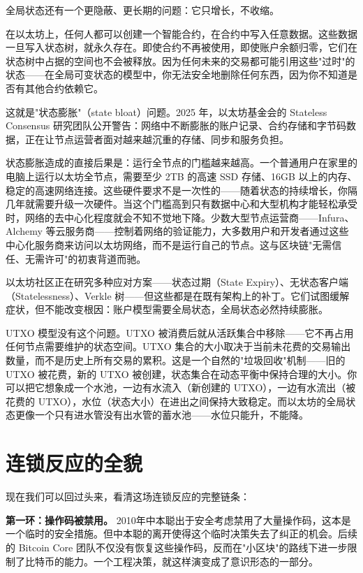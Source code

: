 \documentclass[a4paper,12pt,openany]{ctexbook}
\begin{document}
全局状态还有一个更隐蔽、更长期的问题：它只增长，不收缩。

在以太坊上，任何人都可以创建一个智能合约，在合约中写入任意数据。这些数据一旦写入状态树，就永久存在。即使合约不再被使用，即使账户余额归零，它们在状态树中占据的空间也不会被释放。因为任何未来的交易都可能引用这些"过时"的状态——在全局可变状态的模型中，你无法安全地删除任何东西，因为你不知道是否有其他合约依赖它。

这就是"状态膨胀"（state bloat）问题。2025 年，以太坊基金会的 Stateless Consensus 研究团队公开警告：网络中不断膨胀的账户记录、合约存储和字节码数据，正在让节点运营者面对越来越沉重的存储、同步和服务负担。

状态膨胀造成的直接后果是：运行全节点的门槛越来越高。一个普通用户在家里的电脑上运行以太坊全节点，需要至少 2TB 的高速 SSD 存储、16GB 以上的内存、稳定的高速网络连接。这些硬件要求不是一次性的——随着状态的持续增长，你隔几年就需要升级一次硬件。当这个门槛高到只有数据中心和大型机构才能轻松承受时，网络的去中心化程度就会不知不觉地下降。少数大型节点运营商——Infura、Alchemy 等云服务商——控制着网络的验证能力，大多数用户和开发者通过这些中心化服务商来访问以太坊网络，而不是运行自己的节点。这与区块链"无需信任、无需许可"的初衷背道而驰。

以太坊社区正在研究多种应对方案——状态过期（State Expiry）、无状态客户端（Statelessness）、Verkle 树——但这些都是在既有架构上的补丁。它们试图缓解症状，但不能改变根因：账户模型需要全局状态，全局状态必然持续膨胀。

UTXO 模型没有这个问题。UTXO 被消费后就从活跃集合中移除——它不再占用任何节点需要维护的状态空间。UTXO 集合的大小取决于当前未花费的交易输出数量，而不是历史上所有交易的累积。这是一个自然的"垃圾回收"机制——旧的 UTXO 被花费，新的 UTXO 被创建，状态集合在动态平衡中保持合理的大小。你可以把它想象成一个水池，一边有水流入（新创建的 UTXO），一边有水流出（被花费的 UTXO），水位（状态大小）在进出之间保持大致稳定。而以太坊的全局状态更像一个只有进水管没有出水管的蓄水池——水位只能升，不能降。


\section*{连锁反应的全貌}


现在我们可以回过头来，看清这场连锁反应的完整链条：

\textbf{第一环：操作码被禁用。} 2010年中本聪出于安全考虑禁用了大量操作码，这本是一个临时的安全措施。但中本聪的离开使得这个临时决策失去了纠正的机会。后续的 Bitcoin Core 团队不仅没有恢复这些操作码，反而在"小区块"的路线下进一步限制了比特币的能力。一个工程决策，就这样演变成了意识形态的一部分。
\end{document}
